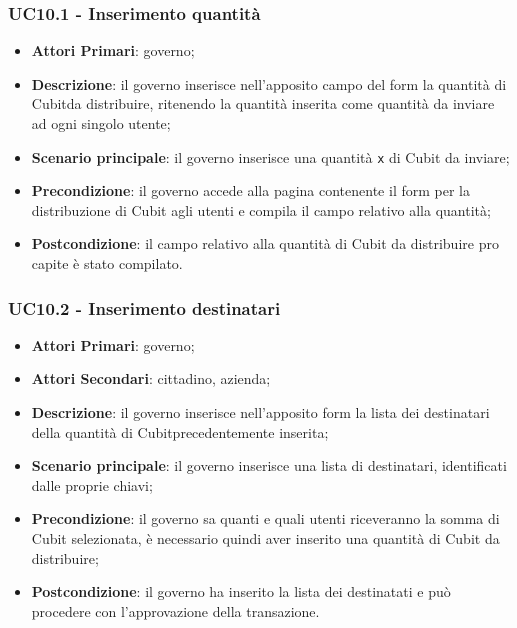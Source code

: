 \subsubsection{UC10.1 - Inserimento quantità}
\begin{itemize}
	\item \textbf{Attori Primari}: governo;
	\item \textbf{Descrizione}: il governo inserisce nell'apposito campo del form la quantità di Cubit\glosp da distribuire, ritenendo la quantità inserita come quantità da inviare ad ogni singolo utente;
	\item \textbf{Scenario principale}: il governo inserisce una quantità \texttt{x} di Cubit da inviare;
	\item \textbf{Precondizione}: il governo accede alla pagina contenente il form per la distribuzione di Cubit agli utenti e compila il campo relativo alla quantità;
	\item \textbf{Postcondizione}: il campo relativo alla quantità di Cubit da distribuire pro capite è stato compilato. 
\end{itemize}
\subsubsection{UC10.2 - Inserimento destinatari}
\begin{itemize}
	\item \textbf{Attori Primari}: governo;
	\item \textbf{Attori Secondari}: cittadino, azienda;
	\item \textbf{Descrizione}: il governo inserisce nell'apposito form la lista dei destinatari della quantità di Cubit\glosp precedentemente inserita;
	\item \textbf{Scenario principale}: il governo inserisce una lista di destinatari, identificati dalle proprie chiavi\glo;
	\item \textbf{Precondizione}: il governo sa quanti e quali utenti riceveranno la somma di Cubit selezionata, è necessario quindi aver inserito una quantità di Cubit da distribuire;
	\item \textbf{Postcondizione}: il governo ha inserito la lista dei destinatati e può procedere con l'approvazione della transazione.
\end{itemize}
